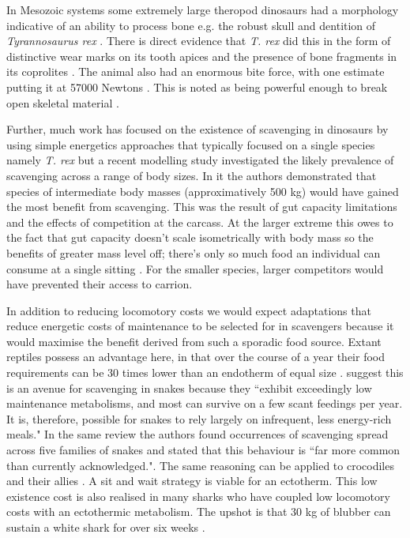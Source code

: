 \documentclass[a4paper,12pt]{article}
\begin{document}
In Mesozoic systems some extremely large theropod dinosaurs had a morphology indicative of an ability to process bone e.g. the robust skull and dentition of \textit{Tyrannosaurus rex} \citep{hone2010feeding}.
There is direct evidence that \textit{T. rex} did this in the form of distinctive wear marks on its tooth apices \citep{farlow1994wear,schubert2005wear} and the presence of bone fragments in its coprolites \citep{chin1998king}.
The animal also had an enormous bite force, with one estimate putting it at 57000 Newtons \citep{bates2012estimating}. %
This is noted as being powerful enough to break open skeletal material \citep{rayfield2001cranial}.

Further, much work has focused on the existence of scavenging in dinosaurs by using simple energetics approaches that typically focused on a single species namely \textit{T. rex} \citep{ruxton2003could,carbone2011intra} but a recent modelling study investigated the likely prevalence of scavenging across a range of body sizes.
In it the authors demonstrated that species of intermediate body masses (approximatively 500 kg) would have gained the most benefit from scavenging.
This was the result of gut capacity limitations and the effects of competition at the carcass.
At the larger extreme this owes to the fact that gut capacity doesn't scale isometrically with body mass so the benefits of greater mass level off; there's only so much food an individual can consume at a single sitting \citep{calder1996size}.
For the smaller species, larger competitors would have prevented their access to carrion.

In addition to reducing locomotory costs we would expect adaptations that reduce energetic costs of maintenance to be selected for in scavengers because it would maximise the benefit derived from such a sporadic food source. 
Extant reptiles possess an advantage here, in that over the course of a year their food requirements can be 30 times lower than an endotherm of equal size \citep{Nagy1621}.
\cite{devault2002scavenging} suggest this is an avenue for scavenging in snakes because they ``exhibit exceedingly low maintenance metabolisms, and most can survive on  a few scant feedings per year.
It is, therefore, possible for snakes to rely largely on infrequent, less energy-rich meals."
In the same review the authors found occurrences of scavenging spread across five families of snakes and stated that this behaviour is ``far more common than currently acknowledged."\citep{devault2002scavenging}.
The same reasoning can be applied to crocodiles and their allies \citep{forrest2003evidence}. 
A sit and wait strategy is viable for an ectotherm. 
This low existence cost is also realised in many sharks who have coupled low locomotory costs with an ectothermic metabolism. 
The upshot is that 30 kg of blubber can sustain a white shark for over six weeks \citep{carey1982temperature}. 
\end{document}
